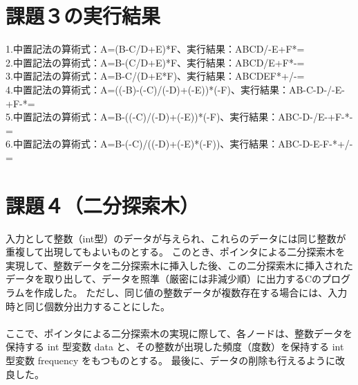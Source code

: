 \documentclass[]{jsarticle}
\begin{document}
\section*{課題３の実行結果}
\noindent1.中置記法の算術式：A=(B-C/D+E)*F、実行結果：ABCD/-E+F*=\\
2.中置記法の算術式：A=B-(C/D+E)*F、実行結果：ABCD/E+F*-=\\
3.中置記法の算術式：A=B-C/(D+E*F)、実行結果：ABCDEF*+/-=\\
4.中置記法の算術式：A=((-B)-(-C)/(-D)+(-E))*(-F)、実行結果：AB-C-D-/-E-+F-*=\\
5.中置記法の算術式：A=B-((-C)/(-D)+(-E))*(-F)、実行結果：ABC-D-/E-+F-*-=\\
6.中置記法の算術式：A=B-(-C)/((-D)+(-E)*(-F))、実行結果：ABC-D-E-F-*+/-=\\

\newpage
\section*{課題４（二分探索木）}
入力として整数（int型）のデータが与えられ、これらのデータには同じ整数が重複して出現してもよいものとする。
このとき、ポインタによる二分探索木を実現して、整数データを二分探索木に挿入した後、この二分探索木に挿入されたデータを取り出して、データを照準（厳密には非減少順）に出力するCのプログラムを作成した。
ただし、同じ値の整数データが複数存在する場合には、入力時と同じ個数分出力することにした。\\
\\ここで、ポインタによる二分探索木の実現に際して、各ノードは、整数データを保持する int 型変数 data と、その整数が出現した頻度（度数）を保持する int 型変数 frequency をもつものとする。
最後に、データの削除も行えるように改良した。\\
\end{document}
